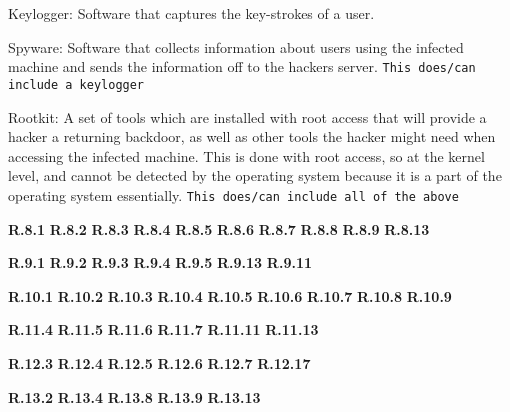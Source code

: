 \documentclass{report}
\begin{document}
Keylogger: Software that captures the key-strokes of a user. 

Spyware: Software that collects information about users using the infected
machine and sends the information off to the hackers server. \texttt{This
does/can include a keylogger}

Rootkit: A set of tools which are installed with root access that will provide a
hacker a returning backdoor, as well as other tools the hacker might need when
accessing the infected machine. This is done with root access, so at the kernel
level, and cannot be detected by the operating system because it is a part of
the operating system essentially. \texttt{This does/can include all of the above}



{\bf R.8.1}
{\bf R.8.2}
{\bf R.8.3}
{\bf R.8.4}
{\bf R.8.5}
{\bf R.8.6}
{\bf R.8.7}
{\bf R.8.8}
{\bf R.8.9}
{\bf R.8.13}



{\bf R.9.1}
{\bf R.9.2}
{\bf R.9.3}
{\bf R.9.4}
{\bf R.9.5}
{\bf R.9.13}
{\bf R.9.11}



{\bf R.10.1}
{\bf R.10.2}
{\bf R.10.3}
{\bf R.10.4}
{\bf R.10.5}
{\bf R.10.6}
{\bf R.10.7}
{\bf R.10.8}
{\bf R.10.9}



{\bf R.11.4}
{\bf R.11.5}
{\bf R.11.6}
{\bf R.11.7}
{\bf R.11.11}
{\bf R.11.13}



{\bf R.12.3}
{\bf R.12.4}
{\bf R.12.5}
{\bf R.12.6}
{\bf R.12.7}
{\bf R.12.17}


{\bf R.13.2}
{\bf R.13.4}
{\bf R.13.8}
{\bf R.13.9}
{\bf R.13.13}
\end{document}
